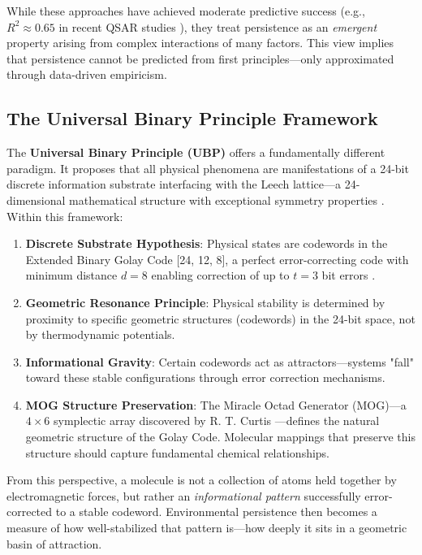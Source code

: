 \documentclass[11pt,letterpaper]{article}
\begin{document}
While these approaches have achieved moderate predictive success (e.g., $R^2 \approx 0.65$ in recent QSAR studies \cite{QSARBiodeg2024}), they treat persistence as an \textit{emergent} property arising from complex interactions of many factors. This view implies that persistence cannot be predicted from first principles—only approximated through data-driven empiricism.

\subsection{The Universal Binary Principle Framework}

The \textbf{Universal Binary Principle (UBP)} \cite{Craig2026} offers a fundamentally different paradigm. It proposes that all physical phenomena are manifestations of a 24-bit discrete information substrate interfacing with the Leech lattice—a 24-dimensional mathematical structure with exceptional symmetry properties \cite{ConwaySloane1999}. Within this framework:

\begin{enumerate}
    \item \textbf{Discrete Substrate Hypothesis}: Physical states are codewords in the Extended Binary Golay Code [24, 12, 8], a perfect error-correcting code with minimum distance $d=8$ enabling correction of up to $t=3$ bit errors \cite{MacWilliams1977}.

    \item \textbf{Geometric Resonance Principle}: Physical stability is determined by proximity to specific geometric structures (codewords) in the 24-bit space, not by thermodynamic potentials.

    \item \textbf{Informational Gravity}: Certain codewords act as attractors—systems "fall" toward these stable configurations through error correction mechanisms.

    \item \textbf{MOG Structure Preservation}: The Miracle Octad Generator (MOG)—a $4\times6$ symplectic array discovered by R. T. Curtis \cite{Curtis1976MOG}—defines the natural geometric structure of the Golay Code. Molecular mappings that preserve this structure should capture fundamental chemical relationships.
\end{enumerate}

From this perspective, a molecule is not a collection of atoms held together by electromagnetic forces, but rather an \textit{informational pattern} successfully error-corrected to a stable codeword. Environmental persistence then becomes a measure of how well-stabilized that pattern is—how deeply it sits in a geometric basin of attraction.
\end{document}
